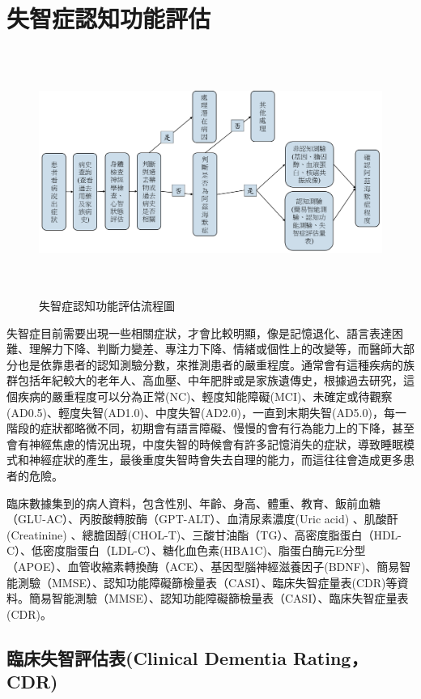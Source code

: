 
\chapter{失智症認知功能評估}
\label{chapter:intro}


\begin{figure}[H]
	\centering
	\centerline{\includegraphics[height=8cm]{pic/ADprocess.PNG}}
	\label{fig:ADProcess}
	\caption{失智症認知功能評估流程圖}
\end{figure}

失智症目前需要出現一些相關症狀，才會比較明顯，像是記憶退化、語言表達困難、理解力下降、判斷力變差、專注力下降、情緒或個性上的改變等，而醫師大部分也是依靠患者的認知測驗分數，來推測患者的嚴重程度。通常會有這種疾病的族群包括年紀較大的老年人、高血壓、中年肥胖或是家族遺傳史，根據過去研究，這個疾病的嚴重程度可以分為正常(NC)、輕度知能障礙(MCI)、未確定或待觀察(AD0.5)、輕度失智(AD1.0)、中度失智(AD2.0)，一直到末期失智(AD5.0)，每一階段的症狀都略微不同，初期會有語言障礙、慢慢的會有行為能力上的下降，甚至會有神經焦慮的情況出現，中度失智的時候會有許多記憶消失的症狀，導致睡眠模式和神經症狀的產生，最後重度失智時會失去自理的能力，而這往往會造成更多患者的危險。

臨床數據集到的病人資料，包含性別、年齡、身高、體重、教育、飯前血糖（GLU-AC）、丙胺酸轉胺酶（GPT-ALT）、血清尿素濃度(Uric acid) 、肌酸酐(Creatinine) 、總膽固醇(CHOL-T)、三酸甘油酯（TG）、高密度脂蛋白（HDL-C）、低密度脂蛋白（LDL-C）、糖化血色素(HBA1C)、脂蛋白酶元E分型（APOE）、血管收縮素轉換酶（ACE）、基因型腦神經滋養因子(BDNF)、簡易智能測驗（MMSE）、認知功能障礙篩檢量表（CASI）、臨床失智症量表(CDR)等資料。簡易智能測驗（MMSE）、認知功能障礙篩檢量表（CASI）、臨床失智症量表(CDR)。

\section{臨床失智評估表(Clinical Dementia Rating，CDR)}

